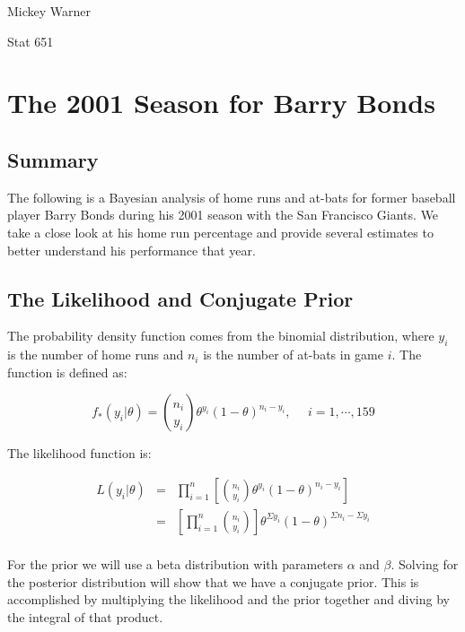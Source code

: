 \documentclass[12pt]{article}
\begin{document}
\noindent Mickey Warner

\noindent Stat 651
\bigskip

\section{The 2001 Season for Barry Bonds}

\subsection{Summary}

\noindent The following is a Bayesian analysis of home runs and at-bats for former baseball player Barry Bonds during his 2001 season with the San Francisco Giants.  We take a close look at his home run percentage and provide several estimates to better understand his performance that year.

\subsection{The Likelihood and Conjugate Prior}

The probability density function comes from the binomial distribution, where $y_i$ is the number of home runs and $n_i$ is the number of at-bats in game $i$.  The function is defined as:

\[f_*(y_i|\theta)={n_i \choose y_i}\theta^{y_i}(1-\theta)^{n_i-y_i},\ \ \ \ \ \ i=1,\cdots,159\]

\noindent The likelihood function is:

\begin{eqnarray*}
L(y_i|\theta) &=& \prod_{i=1}^n\left[{n_i \choose y_i}\theta^{y_i}(1-\theta)^{n_i-y_i}\right] \\
&=& \left[\prod_{i=1}^n{n_i \choose y_i}\right]\theta^{\Sigma y_i}(1-\theta)^{\Sigma n_i-\Sigma y_i} \\
\end{eqnarray*}

\noindent For the prior we will use a beta distribution with parameters $\alpha$ and $\beta$.  Solving for the posterior distribution will show that we have a conjugate prior.  This is accomplished by multiplying the likelihood and the prior together and diving by the integral of that product.
\end{document}
